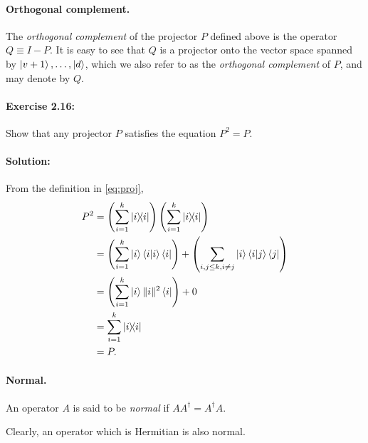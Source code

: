 \paragraph{Orthogonal complement.} The \emph{orthogonal complement} of the
projector $P$ defined above is the operator $Q \equiv I - P$. It is easy to see
that $Q$ is a projector onto the vector space spanned by $\ket{v+1}, \ldots,
\ket{d}$, which we also refer to as the \emph{orthogonal complement} of $P$,
and may denote by $Q$.

\paragraph{\cite{mikeandike} Exercise 2.16:} Show that any projector $P$
satisfies the equation $P^2 = P$.

\paragraph{Solution:} From the definition in \eqref{eq:proj}, \begin{align*}
  P^2 &= \left(\sum_{i=1}^k \ketbra{i}{i}\right) \left(\sum_{i=1}^k
      \ketbra{i}{i}\right) \\
    &= \left(\sum_{i=1}^k \ket{i}\braket{i}{i}\bra{i}\right) + \left(\sum_{i, j
      \leq k, i \neq j} \ket{i}\braket{i}{j}\bra{j}\right) \\
    &= \left(\sum_{i=1}^k \ket{i} \|i\|^2 \bra{i}\right) + 0 \\
    &= \sum_{i=1}^k \ketbra{i}{i} \\
    &= P.
\end{align*}

\paragraph{Normal.} An operator $A$ is said to be \emph{normal} if $A A^\dagger
= A^\dagger A$.

Clearly, an operator which is Hermitian is also normal.

